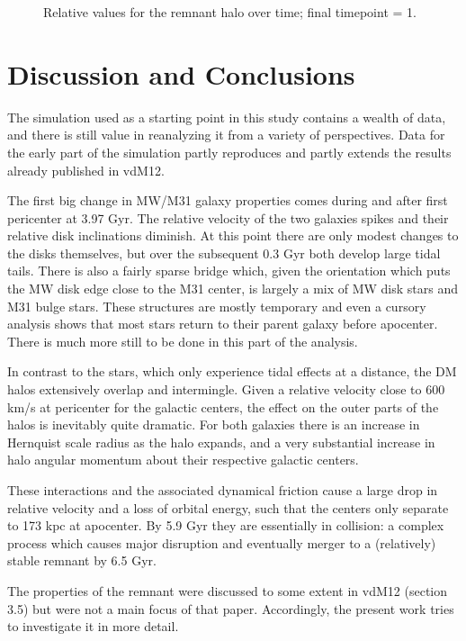 \documentclass[twocolumn]{aastex63}
\begin{document}
\begin{figure}[htb!]
	\caption{Relative values for the remnant halo over time; final timepoint = 1.
		\label{fig:rem_data}}
\end{figure}


\section{Discussion and Conclusions}

The simulation used as a starting point in this study contains a wealth of data, and there is still value in reanalyzing it from a variety of perspectives. Data for the early part of the simulation partly reproduces and partly extends the results already published in vdM12. 

The first big change in MW/M31 galaxy properties comes during and after first pericenter at 3.97 Gyr. The relative velocity of the two galaxies spikes and their relative disk inclinations diminish. At this point there are only modest changes to the disks themselves, but over the subsequent 0.3 Gyr both develop large tidal tails. There is also a fairly sparse bridge which, given the orientation which puts the MW disk edge close to the M31 center, is largely a mix of MW disk stars and M31 bulge stars. These structures are mostly temporary and even a cursory analysis shows that most stars return to their parent galaxy before apocenter. There is much more still to be done in this part of the analysis.

In contrast to the stars, which only experience tidal effects at a distance, the DM halos extensively overlap and intermingle. Given a relative velocity close to 600 km/s at pericenter for the galactic centers, the effect on the outer parts of the halos is inevitably quite dramatic. For both galaxies there is an increase in Hernquist scale radius as the halo expands, and a very substantial increase in halo angular momentum about their respective galactic centers.

These interactions and the associated dynamical friction cause a large drop in relative velocity and a loss of orbital energy, such that the centers only separate to 173 kpc at apocenter. By 5.9 Gyr they are essentially in collision: a complex process which causes major disruption and eventually merger to a (relatively) stable remnant by 6.5 Gyr.

The properties of the remnant were discussed to some extent in vdM12 (section 3.5) but were not a main focus of that paper. Accordingly, the present work tries to investigate it in more detail.
\end{document}
